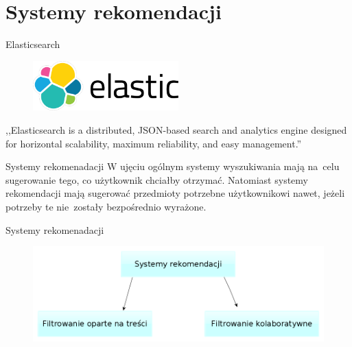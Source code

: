 \documentclass{beamer}
\begin{document}
	\section{Systemy rekomendacji}
	\begin{frame}{Elasticsearch}
		\begin{figure}
			\centering
			\includegraphics[width=0.5\textwidth]{img/elastic-logo.png}
		\end{figure}
		,,Elasticsearch is a distributed, JSON-based search and analytics engine designed for horizontal scalability, maximum reliability, and easy management.''
	\end{frame}

	\begin{frame}{Systemy rekomenadacji}
		W ujęciu ogólnym systemy wyszukiwania mają na~celu sugerowanie tego, co użytkownik chciałby otrzymać. Natomiast systemy rekomendacji mają sugerować przedmioty potrzebne użytkownikowi nawet, jeżeli potrzeby te nie~zostały bezpośrednio wyrażone.
	\end{frame}
	
	\begin{frame}{Systemy rekomenadacji}
		\begin{figure}
			\centering
			\includegraphics[width=1\textwidth]{img/recommender.png}
		\end{figure}
	\end{frame}
\end{document}
